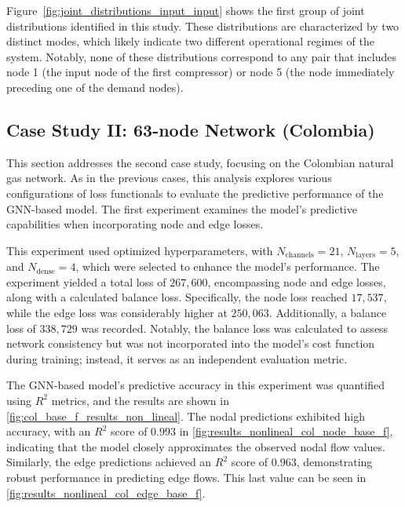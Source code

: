 Figure~\ref{fig:joint_distributions_input_input} shows the first group of joint distributions identified in this study. These distributions are characterized by two distinct modes, which likely indicate two different operational regimes of the system. Notably, none of these distributions correspond to any pair that includes node 1 (the input node of the first compressor) or node 5 (the node immediately preceding one of the demand nodes).

















\subsection{Case Study II: 63-node Network (Colombia)}


This section addresses the second case study, focusing on the Colombian natural gas network. As in the previous cases, this analysis explores various configurations of loss functionals to evaluate the predictive performance of the GNN-based model. The first experiment examines the model's predictive capabilities when incorporating node and edge losses.


This experiment used optimized hyperparameters, with \( N_{\text{channels}} = 21 \), \( N_{\text{layers}} = 5 \), and \( N_{\text{dense}} = 4 \), which were selected to enhance the model's performance. The experiment yielded a total loss of \( 267,600 \), encompassing node and edge losses, along with a calculated balance loss. Specifically, the node loss reached \( 17,537 \), while the edge loss was considerably higher at \( 250,063 \). Additionally, a balance loss of \( 338,729 \) was recorded. Notably, the balance loss was calculated to assess network consistency but was not incorporated into the model's cost function during training; instead, it serves as an independent evaluation metric. 

The GNN-based model's predictive accuracy in this experiment was quantified using \( R^2 \) metrics, and the results are shown in \cref{fig:col_base_f_results_non_lineal}. The nodal predictions exhibited high accuracy, with an \( R^2 \) score of \( 0.993 \) in \cref{fig:results_nonlineal_col_node_base_f}, indicating that the model closely approximates the observed nodal flow values. Similarly, the edge predictions achieved an \( R^2 \) score of \( 0.963 \), demonstrating robust performance in predicting edge flows. This last value can be seen in \cref{fig:results_nonlineal_col_edge_base_f}.


